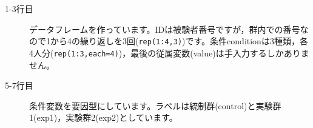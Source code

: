 \begin{description}
	\item[1-3行目] データフレームを作っています。IDは被験者番号ですが，群内での番号なので1から4の繰り返しを3回(\texttt{rep(1:4,3)})です。条件conditionは3種類，各4人分(\texttt{rep(1:3,each=4)})，最後の従属変数(value)は手入力するしかありません。
	\item[5-7行目] 条件変数を要因型にしています。ラベルは統制群(control)と実験群1(exp1)，実験群2(exp2)としています。
\end{description}
